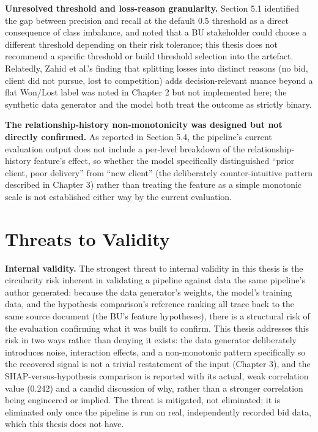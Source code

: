 \textbf{Unresolved threshold and loss-reason granularity.} Section 5.1
identified the gap between precision and recall at the default 0.5
threshold as a direct consequence of class imbalance, and noted that a
BU stakeholder could choose a different threshold depending on their
risk tolerance; this thesis does not recommend a specific threshold or
build threshold selection into the artefact. Relatedly, Zahid et al.'s
\citeyearpar{zahid2021predicting} finding that splitting losses into
distinct reasons (no bid, client did not pursue, lost to competition)
adds decision-relevant nuance beyond a flat Won/Lost label was noted in
Chapter 2 but not implemented here; the synthetic data generator and the
model both treat the outcome as strictly binary.

\textbf{The relationship-history non-monotonicity was designed but not
directly confirmed.} As reported in Section 5.4, the pipeline's current
evaluation output does not include a per-level breakdown of the
relationship-history feature's effect, so whether the model specifically
distinguished ``prior client, poor delivery'' from ``new client'' (the
deliberately counter-intuitive pattern described in Chapter 3) rather
than treating the feature as a simple monotonic scale is not established
either way by the current evaluation.

\hypertarget{threats-to-validity}{%
\section{Threats to Validity}\label{threats-to-validity}}

\textbf{Internal validity.} The strongest threat to internal validity in
this thesis is the circularity risk inherent in validating a pipeline
against data the same pipeline's author generated: because the data
generator's weights, the model's training data, and the hypothesis
comparison's reference ranking all trace back to the same source
document (the BU's feature hypotheses), there is a structural risk of
the evaluation confirming what it was built to confirm. This thesis
addresses this risk in two ways rather than denying it exists: the data
generator deliberately introduces noise, interaction effects, and a
non-monotonic pattern specifically so the recovered signal is not a
trivial restatement of the input (Chapter 3), and the
SHAP-versus-hypothesis comparison is reported with its actual, weak
correlation value (0.242) and a candid discussion of why, rather than a
stronger correlation being engineered or implied. The threat is
mitigated, not eliminated; it is eliminated only once the pipeline is
run on real, independently recorded bid data, which this thesis does not
have.

